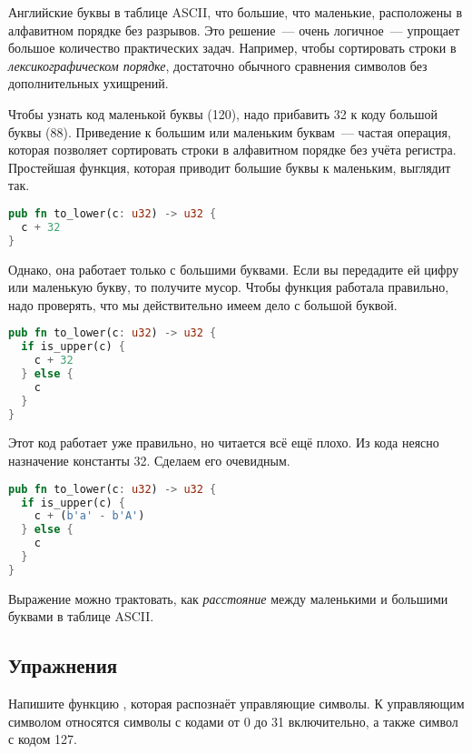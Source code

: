 Английские буквы в таблице ASCII, что большие, что маленькие, расположены в алфавитном порядке без разрывов.
Это решение~--- очень логичное~--- упрощает большое количество практических задач.
Например, чтобы сортировать строки в {\em лексикографическом порядке}, достаточно обычного сравнения символов без дополнительных ухищрений.

Чтобы узнать код маленькой буквы  (120), надо прибавить 32 к коду большой буквы  (88).
Приведение к большим или маленьким буквам~--- частая операция, которая позволяет сортировать строки в алфавитном порядке без учёта регистра.
Простейшая функция, которая приводит большие буквы к маленьким, выглядит так.

\begin{lstlisting}[language=Rust]
pub fn to_lower(c: u32) -> u32 {
  c + 32
}
\end{lstlisting}

Однако, она работает только с большими буквами. Если вы передадите ей цифру или маленькую букву, то получите мусор.
Чтобы функция работала правильно, надо проверять, что мы действительно имеем дело с большой буквой.

\begin{lstlisting}[language=Rust]
pub fn to_lower(c: u32) -> u32 {
  if is_upper(c) {
    c + 32
  } else {
    c
  }
}
\end{lstlisting}

Этот код работает уже правильно, но читается всё ещё плохо.
Из кода неясно назначение константы 32.
Сделаем его очевидным.

\begin{lstlisting}[language=Rust]
pub fn to_lower(c: u32) -> u32 {
  if is_upper(c) {
    c + (b'a' - b'A')
  } else {
    c
  }
}
\end{lstlisting}

Выражение  можно трактовать, как {\em расстояние} между маленькими и большими буквами в таблице ASCII.

\subsection{Упражнения}

\begin{Exercise}
  \Question
  Напишите функцию , которая распознаёт управляющие символы.
  К управляющим символом относятся символы с кодами от 0 до 31 включительно, а также символ с кодом 127.
\end{Exercise}
  
